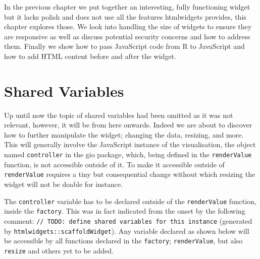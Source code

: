 \documentclass[
]{krantz}
\begin{document}
In the previous chapter we put together an interesting, fully functioning widget but it lacks polish and does not use all the features htmlwidgets provides, this chapter explores those. We look into handling the size of widgets to ensure they are responsive as well as discuss potential security concerns and how to address them. Finally we show how to pass JavaScript code from R to JavaScript and how to add HTML content before and after the widget.

\hypertarget{widgets-adv-shared}{%
\section{Shared Variables}\label{widgets-adv-shared}}

Up until now the topic of shared variables had been omitted as it was not relevant, however, it will be from here onwards. Indeed we are about to discover how to further manipulate the widget; changing the data, resizing, and more. This will generally involve the JavaScript instance of the visualisation, the object named \texttt{controller} in the gio package, which, being defined in the \texttt{renderValue} function, is not accessible outside of it. To make it accessible outside of \texttt{renderValue} requires a tiny but consequential change without which resizing the widget will not be doable for instance.

The \texttt{controller} variable has to be declared outside of the \texttt{renderValue} function, inside the \texttt{factory}. This was in fact indicated from the onset by the following comment: \texttt{//\ TODO:\ define\ shared\ variables\ for\ this\ instance} (generated by \texttt{htmlwidgets::scaffoldWidget}). Any variable declared as shown below will be accessible by all functions declared in the \texttt{factory}; \texttt{renderValue}, but also \texttt{resize} and others yet to be added.
\end{document}
